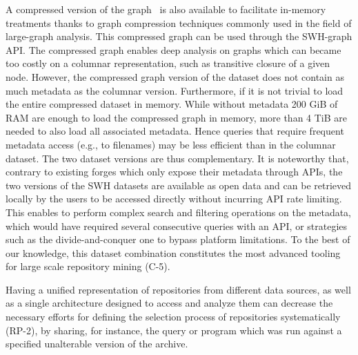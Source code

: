 A compressed version of the graph~\cite{DBLP:conf/wcre/BoldiPVZ20} is also available to facilitate in-memory treatments thanks to graph compression techniques commonly used in the field of large-graph analysis. 
This compressed graph can be used through the SWH-graph API. 
The compressed graph enables deep analysis on graphs which can became too costly on a columnar representation, such as transitive closure of a given node.
However, the compressed graph version of the dataset does not contain as much metadata as the columnar version.
Furthermore, if it is not trivial to load the entire compressed dataset in memory. While without metadata 200 GiB of RAM are enough to load the compressed graph in memory, more than 4 TiB are needed to also load all associated metadata. Hence queries that require frequent metadata access (e.g., to filenames) may be less efficient than in the columnar dataset. 
The two dataset versions are thus complementary.
It is noteworthy that, contrary to existing forges which only expose their metadata through APIs, the two versions of the SWH datasets are available as open data and can be retrieved locally by the users to be accessed directly without incurring API rate limiting.
This enables to perform complex search and filtering operations on the metadata, which would have required several consecutive queries with an API, or strategies such as the divide-and-conquer one to bypass platform limitations.
To the best of our knowledge, this dataset combination constitutes the most advanced tooling for large scale repository mining (C-5).

Having a unified representation of repositories from different data sources, as well as a single architecture designed to access and analyze them can decrease the necessary efforts for defining the selection process of repositories systematically (RP-2), by sharing, for instance, the query or program which was run against a specified unalterable version of the archive.
